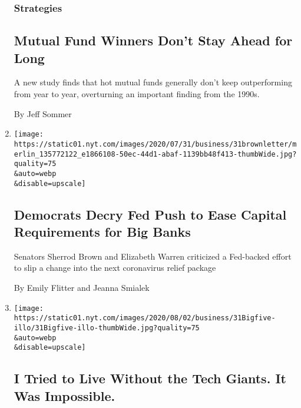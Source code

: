 \begin{enumerate}
  \hypertarget{strategies}{%
  \subsubsection{Strategies}\label{strategies}}

  \hypertarget{mutual-fund-winners-dont-stay-ahead-for-long}{%
  \subsection{Mutual Fund Winners Don't Stay Ahead for
  Long}\label{mutual-fund-winners-dont-stay-ahead-for-long}}

  A new study finds that hot mutual funds generally don't keep
  outperforming from year to year, overturning an important finding from
  the 1990s.

  By Jeff Sommer
\item
  \href{/2020/07/31/business/democrats-fed-banks-capital-requirements.html}{}

  \texttt{[image: https://static01.nyt.com/images/2020/07/31/business/31brownletter/merlin\_135772122\_e1866108-50ec-44d1-abaf-1139bb48f413-thumbWide.jpg?quality=75\\\&auto=webp\\\&disable=upscale]}

  \hypertarget{democrats-decry-fed-push-to-ease-capital-requirements-for-big-banks}{%
  \subsection{Democrats Decry Fed Push to Ease Capital Requirements for
  Big
  Banks}\label{democrats-decry-fed-push-to-ease-capital-requirements-for-big-banks}}

  Senators Sherrod Brown and Elizabeth Warren criticized a Fed-backed
  effort to slip a change into the next coronavirus relief package

  By Emily Flitter and Jeanna Smialek
\item
  \href{/2020/07/31/technology/blocking-the-tech-giants.html}{}

  \texttt{[image: https://static01.nyt.com/images/2020/08/02/business/31Bigfive-illo/31Bigfive-illo-thumbWide.jpg?quality=75\\\&auto=webp\\\&disable=upscale]}

  \hypertarget{i-tried-to-live-without-the-tech-giants-it-was-impossible}{%
  \subsection{I Tried to Live Without the Tech Giants. It Was
  Impossible.}\label{i-tried-to-live-without-the-tech-giants-it-was-impossible}}


\end{enumerate}
